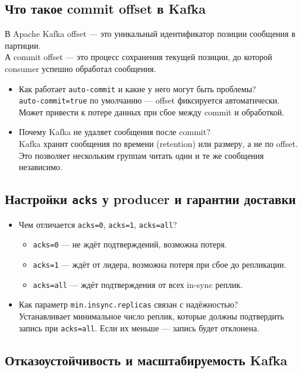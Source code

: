 \documentclass[a4paper,14pt]{article}
\begin{document}
\subsection{Что такое commit offset в Kafka}
В Apache Kafka offset — это уникальный идентификатор позиции сообщения в партиции. \\
А commit offset — это процесс сохранения текущей позиции, до которой consumer успешно обработал сообщения.
\begin{itemize}
\item Как работает \texttt{auto-commit} и какие у него могут быть проблемы? \\
\texttt{auto-commit=true} по умолчанию — offset фиксируется автоматически. Может привести к потере данных при сбое между commit и обработкой.

\item Почему Kafka не удаляет сообщения после commit? \\
Kafka хранит сообщения по времени (retention) или размеру, а не по offset. Это позволяет нескольким группам читать одни и те же сообщения независимо.
\end{itemize}

\subsection{Настройки \texttt{acks} у producer и гарантии доставки}

\begin{itemize}
\item Чем отличается \texttt{acks=0}, \texttt{acks=1}, \texttt{acks=all}?
\begin{itemize}
  \item \texttt{acks=0} — не ждёт подтверждений, возможна потеря.
  \item \texttt{acks=1} — ждёт от лидера, возможна потеря при сбое до репликации.
  \item \texttt{acks=all} — ждёт подтверждения от всех in-sync реплик.
\end{itemize}

\item Как параметр \texttt{min.insync.replicas} связан с надёжностью? \\
Устанавливает минимальное число реплик, которые должны подтвердить запись при \texttt{acks=all}. Если их меньше — запись будет отклонена.
\end{itemize}

\subsection{Отказоустойчивость и масштабируемость Kafka}
\end{document}
